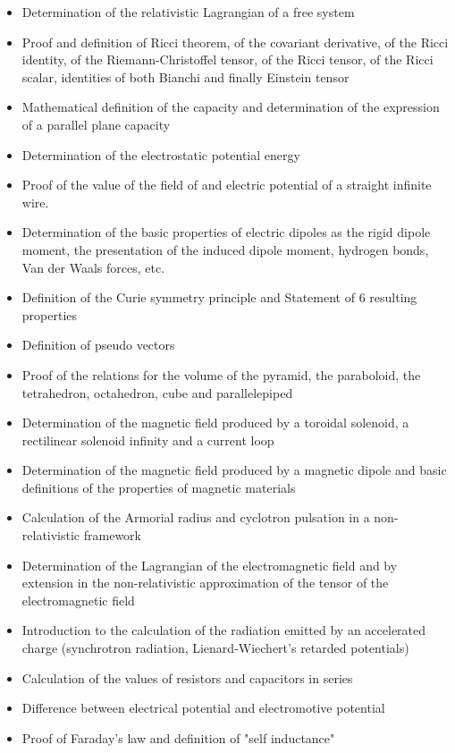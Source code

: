 \documentclass[12pt,a4paper,twoside,openright]{report}
\newcounter{def}
\theoremstyle{definition}
\theoremstyle{itexmp}
\numberwithin{equation}{section}
\begin{document}
\begin{itemize}
\begin{itemize}[noitemsep]
			\item Determination of the relativistic Lagrangian of a free system
			\item Proof and definition of Ricci theorem, of the covariant derivative, of the Ricci identity, of the Riemann-Christoffel tensor, of the Ricci tensor, of the Ricci scalar, identities of both Bianchi and finally Einstein tensor
			\item Mathematical definition of the capacity and determination of the expression of a  parallel plane capacity
			\item Determination of the electrostatic potential energy
			\item Proof of the value of the field of and electric potential of a straight infinite wire.
			\item Determination of the basic properties of electric dipoles as the rigid dipole moment, the presentation of the induced dipole moment, hydrogen bonds, Van der Waals forces, etc.
			\item Definition of the Curie symmetry principle and Statement of 6 resulting properties
			\item Definition of pseudo vectors
			\item Proof of the relations for the volume of the pyramid, the paraboloid, the tetrahedron, octahedron, cube and parallelepiped
			\item Determination of the magnetic field produced by a toroidal solenoid, a rectilinear solenoid infinity and a current loop
			\item Determination of the magnetic field produced by a magnetic dipole and basic definitions of the properties of magnetic materials
			\item Calculation of the Armorial radius and cyclotron pulsation in a non-relativistic framework
			\item Determination of the Lagrangian of the electromagnetic field and by extension in the non-relativistic approximation of the tensor of the electromagnetic field
			\item Introduction to the calculation of the radiation emitted by an accelerated charge (synchrotron radiation, Lienard-Wiechert's retarded potentials)
			\item Calculation of the values of resistors and capacitors in series
			\item Difference between electrical potential and electromotive potential
			\item Proof of Faraday's law and definition of "self inductance"

\end{itemize}
\end{itemize}
\end{document}
